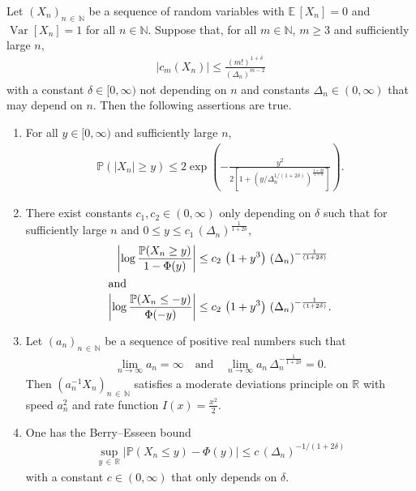 \documentclass[AHL,Unicode,longabstracts,published]{cedram}
\newcommand{\N}{\mathbb{N}}
\newcommand{\EE}{\mathbb{E}\,}
\newcommand{\PP}{\mathbb{P}}
\newcommand{\Var}{\mathop{\mathrm{Var}}\nolimits}
\newcommand*{\romanenumi}{\renewcommand*{\theenumi}{\roman{enumi}}}
\begin{document}
\begin{lemm}\label{lem:ConsequenceCumBounds}
Let $(X_n)_{n\,\in\,\N}$ be a sequence of random variables with $\EE[X_n] = 0$ and $\Var[X_n] = 1$ for all $n\in\N$. Suppose that, for all $m\in \N$, $m\ge 3$ and sufficiently large $n$,
\begin{align}\label{eq:CumBoundAbstract}
|c_m(X_n)| \leq \frac{(m!)^{1 + \delta}}{(\Delta_n)^{m-2}}
\end{align}
with a constant $\delta \in [0,\infty)$ not depending on $n$ and constants $\Delta_n \in (0,\infty)$ that may depend on $n$. Then the following assertions are true.
\begin{enumerate}\romanenumi
\item \label{list4.2.1}For all $y\in[0,\infty)$ and sufficiently large $n$,
\begin{align*}
\PP(|X_n| \geq y) \leq 2 \exp\left(-\frac{y^2}{2\left[1+\left(y/\Delta_n^{1/(1+2\delta)}\right)^\frac{1+2\delta}{1+\delta}\right]}\right).
\end{align*}
\item\label{list4.2.2} There exist constants $c_1,c_2 \in (0,\infty)$ only depending on $\delta$ such that for sufficiently large $n$ and $0\leq y\leq c_1\,(\Delta_n)^{\frac{1}{1 + 2\delta}}$,
\begin{align*}
\left|\log \frac{\PP(X_n \geq y)}{1 - \Phi(y)}\right| &\leq c_2\, \left(1 + y^3\right)\, (\Delta_n)^{-\frac{1}{(1+2\delta)}}\\ \intertext{and}
\left|\log \frac{\PP(X_n \leq -y)}{\Phi(-y)}\right| &\leq c_2\, \left(1 + y^3\right)\,(\Delta_n)^{-\frac{1}{(1+2\delta)}}.
\end{align*}
\item\label{list4.2.3} Let $(a_n)_{n\,\in\,\N}$ be a sequence of positive real numbers such that
\begin{align*}
\lim\limits_{n \rightarrow \infty} a_n = \infty \quad \text{and}\quad \lim\limits_{n \rightarrow \infty} a_n\, \Delta_n^{-\frac{1}{1 + 2\delta}} = 0.
\end{align*}
Then $(a_n^{-1} X_n)_{n\,\in\,\N}$ satisfies a moderate deviations principle on $\mathbb{R}$ with speed $a_n^2$ and rate function $I(x) = \frac{x^2}{2}$.
\item\label{list4.2.4} One has the Berry--Esseen bound
\begin{align*}
\sup\limits_{y\,\in\,\mathbb{R}} |\PP(X_n \leq y) - \Phi(y)| \leq c\, (\Delta_n)^{-1/(1+2\delta)}
\end{align*}
with a constant $c\in (0,\infty)$ that only depends on $\delta$.
\end{enumerate}
\end{lemm}
\end{document}
